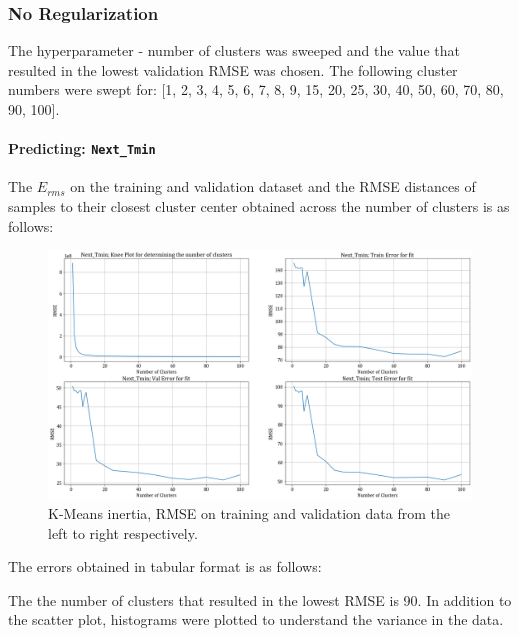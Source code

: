 \documentclass[12pt,a4paper]{article}
\newcommand{\noi}{\noindent}
\def\tt#1{\texttt{#1}}
\begin{document}
\subsubsection{No Regularization}
The hyperparameter - number of clusters was sweeped and the value that resulted in the lowest validation RMSE was chosen. The following cluster numbers were swept for: [1, 2, 3, 4, 5, 6, 7, 8, 9, 15, 20, 25, 30, 40, 50, 60, 70, 80, 90, 100].

\paragraph{Predicting: \tt{Next\_Tmin}}
The $E_{rms}$ on the training and validation dataset and the RMSE distances of samples to their closest cluster center obtained across the number of clusters is as follows:
\begin{figure}[H]
     \centering
     \includegraphics[scale=0.4]{images/t3_d3/no_reg/tmin_errors.png}
     \caption{K-Means inertia, RMSE on training and validation data from the left to right respectively.}
\end{figure}

\vspace{-1em}
\noi
The errors obtained in tabular format is as follows:


\noi
The the number of clusters that resulted in the lowest RMSE is 90. In addition to the scatter plot, histograms were plotted to understand the variance in the data.\\
\end{document}
